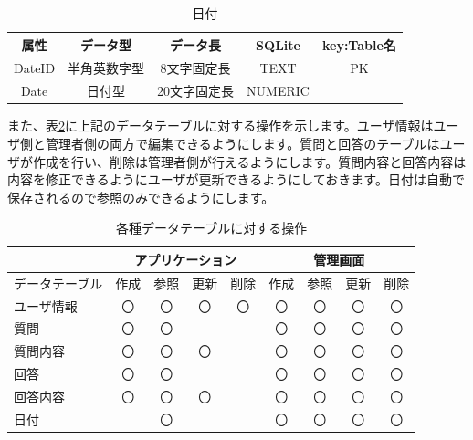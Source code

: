 \documentclass[a4j]{jarticle}
\begin{document}
\begin{table}[H]
    \caption{日付}
    \label{tbl: date}
    \begin{center}
        \begin{tabular}{|c|c|c|c|c|} \hline
            属性 & データ型 & データ長 & SQLite & key:Table名\\ \hline \hline
            DateID & 半角英数字型 & 8文字固定長 & TEXT & PK\\ \hline
            Date & 日付型 & 20文字固定長 & NUMERIC & \\ \hline
        \end{tabular}
    \end{center}
\end{table}


また、表\ref{tbl: datatable}に上記のデータテーブルに対する操作を示します。ユーザ情報はユーザ側と管理者側の両方で編集できるようにします。質問と回答のテーブルはユーザが作成を行い、削除は管理者側が行えるようにします。質問内容と回答内容は内容を修正できるようにユーザが更新できるようにしておきます。日付は自動で保存されるので参照のみできるようにします。

\begin{table}[H]
    \caption{各種データテーブルに対する操作}
    \label{tbl: datatable}
    \begin{center}
        \begin{tabular}{|l||c|c|c|c||c|c|c|c|} \hline
             & \multicolumn{4}{|c||}{アプリケーション} & \multicolumn{4}{|c|}{管理画面}\\ \hline
            データテーブル & \multicolumn{1}{|l|}{作成} & \multicolumn{1}{|l|}{参照} & \multicolumn{1}{|l|}{更新} & \multicolumn{1}{|l||}{削除} & \multicolumn{1}{|l|}{作成} & \multicolumn{1}{|l|}{参照} & \multicolumn{1}{|l|}{更新} & \multicolumn{1}{|l|}{削除}\\ \hline \hline
            ユーザ情報 & 〇 & 〇 & 〇 & 〇 & 〇 & 〇 & 〇 & 〇\\ \hline
            質問 & 〇 & 〇 &  &  & 〇 & 〇 & 〇 & 〇\\ \hline
            質問内容 & 〇 & 〇 & 〇 &  & 〇 & 〇 & 〇 & 〇\\ \hline
            回答 & 〇 & 〇 &  &  & 〇 & 〇 & 〇 & 〇\\ \hline
            回答内容 & 〇 & 〇 & 〇 &  & 〇 & 〇 & 〇 & 〇\\ \hline
            日付 &  & 〇 &  &  & 〇 & 〇 & 〇 & 〇\\ \hline
        \end{tabular}
    \end{center}
\end{table}
\end{document}
